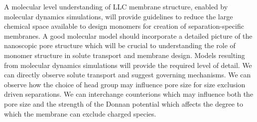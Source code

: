\documentclass{article}
\begin{document}
  A molecular level understanding of LLC membrane structure, enabled by
  molecular dynamics simulations, will provide guidelines to reduce the large
  chemical space available to design monomers for creation of separation-specific
  membranes. A good molecular model should incorporate a detailed picture of the
  nanoscopic pore structure which will be crucial to understanding the role of
  monomer structure in solute transport and membrane design. Models resulting
  from molecular dynamics simulations will provide the required level of detail.
  We can directly observe solute transport and suggest governing mechanisms. We
  can observe how the choice of head group may influence pore size for size
  exclusion driven separations. We can interchange counterions which may
  influence both the pore size and the strength of the Donnan potential which
  affects the degree to which the membrane can exclude charged species. 
\end{document}
